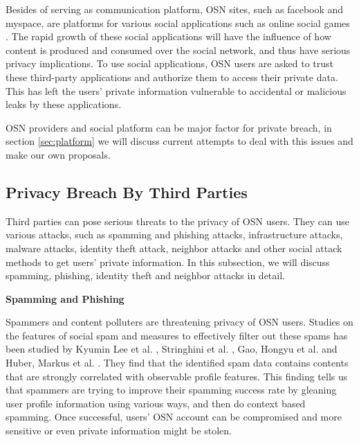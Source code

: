\documentclass[12pt]{article}
\begin{document}
Besides of serving as communication platform, OSN sites,
such as facebook and myspace\cite{myspacesite}, are platforms for
various social applications such as online social games
\cite{xbook-social-platform} \cite{facebook-social-app}
\cite{privacy-fundamental-construct}. The rapid 
growth of these social applications will have the influence of how
content is produced and consumed over the social network, and thus
have serious privacy implications. To use social applications, OSN
users are asked to trust these third-party applications and authorize
them to access their private data. This has left the users' private
information vulnerable to accidental or malicious leaks by these
applications. 

OSN providers and social platform can be major factor for private
breach, in section \ref{sec:platform} we will discuss current attempts
to deal with this issues and make our own proposals. 

\subsection{Privacy Breach By Third Parties\label{subsec:thirdparty}}
Third parties can pose serious threats to the privacy of OSN
users. They can use various attacks\cite{SN-seven-deadly-attacks},
such as spamming and phishing attacks, infrastructure attacks, malware
attacks, identity theft attack, neighbor attacks and other social
attack methods to get users' private information. In this subsection,
we will discuss spamming, phishing, identity theft and neighbor
attacks in detail.

\textbf{Spamming and Phishing\cite{spamming-phishing-privacy}} 

Spammers and content polluters are threatening privacy of OSN
users. Studies on the features of social spam and measures to
effectively filter out these spams has been studied by Kyumin Lee et 
al. \cite{social-spammer-machine-learning}, Stringhini et
al. \cite{SN-detect-spam}, Gao, Hongyu et
al. \cite{SN-spam-campaigns} and Huber, Markus et
al. \cite{SN-explore-spam}. They find that the 
identified spam data contains contents that are strongly correlated
with observable profile features. This finding tells us that spammers
are trying to improve their spamming success rate by gleaning user
profile information using various ways, and then do context based
spamming. Once successful, users' OSN account can be compromised and
more sensitive or even private information might be stolen. 
\end{document}
